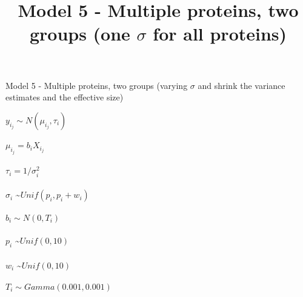 \documentclass[12pt]{article}
\title{Model 5 - Multiple proteins, two groups (one $\sigma$ for all proteins)}
\begin{document}
\begin{center}{\LARGE Model 5 - Multiple proteins, two groups (varying $\sigma$ and shrink the variance estimates and the effective size)}\end{center} 

\hspace{0.2in}

$y_i_j \sim N(\mu_i_j, \tau_i)$ 
\\

\\
$\mu_i_j = b_iX_i_j$
\\

\\
$\tau_i= 1/\sigma_i^2$
\\

\\
$\sigma_i$ \sim $Unif(p_i, p_i+w_i)$
\\

\\
$b_i \sim N(0, T_i)$
\\

\\
$p_i$ \sim $Unif(0, 10)$
\\

\\
$w_i$ \sim $Unif(0, 10)$
\\

\\
$T_i \sim Gamma(0.001, 0.001)$
\\
%
\\
\\
%
\\

\\

\\
\end{document}
